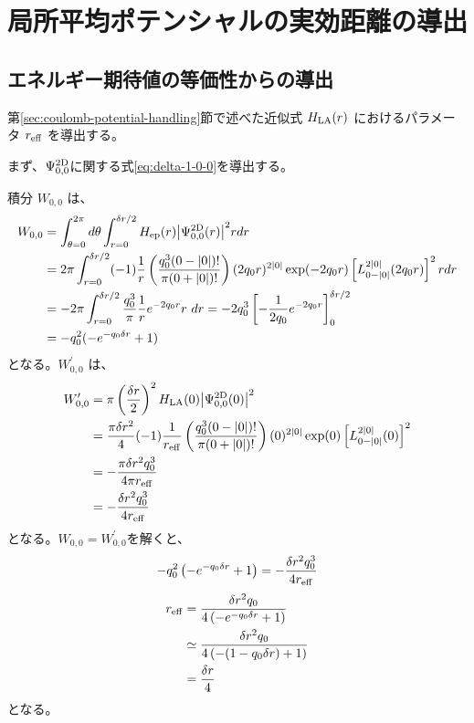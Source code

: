 \documentclass[wabun2025.tex]{subfiles}
\begin{document}
\appendix
\section{局所平均ポテンシャルの実効距離の導出}
\label{chap:appendix_derivation_derivation}
\subsection{エネルギー期待値の等価性からの導出}
第\ref{sec:coulomb-potential-handling}節で述べた近似式 $H_{\mathrm{LA}}(r)$ におけるパラメータ $r_{\mathrm{eff}}$
を導出する。

まず、$\Psi^{\mathrm{2D}}_{0,0}$に関する式\eqref{eq:delta-1-0-0}を導出する。

積分 $W_{0,0}$ は、
\begin{align}
  W_{0,0}
   &= \int_{\theta=0}^{2\pi}d\theta
      \int_{r=0}^{\deltar/2}
      \Hep(r)\abs{\PsiTwoD_{0,0}(r)}^2r dr\notag\\
   &= 2\pi
      \int_{r=0}^{\deltar/2}
      (-1)\frac{1}{r}\left(\frac{q_0^3(0-\abs{0})!}{\pi(0+\abs{0})!}\right)
      (2q_0r)^{2\abs{0}}\exp(-2q_0r)
      \left[L_{0-\abs{0}}^{2\abs{0}}(2q_0r)\right]^2 r dr\notag\\
   &= -2\pi\int_{r=0}^{\deltar/2}\frac{q_0^3}{\pi}\frac{1}{r}e^{-2q_0r}r\ dr=-2q_0^3
      \left[-\frac{1}{2q_0}e^{-2q_0r}\right]_{0}^{\deltar/2}\notag\\
   &=-q_0^2(-e^{-q_0\deltar}+1)
\end{align}
となる。$W_{0,0}^\prime$ は、
\begin{align}
    W_{0,0}^\prime
    &=\pi\left(\frac{\delta r}{2}\right)^2
       H_{\mathrm{LA}}(0){\left| \Psi^{\mathrm{2D}}_{0,0}(0) \right|}^2\notag\\
    &=\frac{\pi\delta r^2}{4}(-1)\frac{1}{r_{\mathrm{eff}}}
    \left(\frac{q_0^3(0-{\left| 0 \right|})!}{\pi(0+{\left| 0 \right|})!}\right)
    (0)^{2{\left| 0 \right|}}\exp(0)\left[L_{0-{\left| 0 \right|}}^{2{\left| 0 \right|}}(0)\right]^2\notag\\
    &= -\frac{\pi\delta r^2q_0^3}{4\pi r_{\mathrm{eff}}}\notag\\
    &= -\frac{\delta r^2q_0^3}{4r_{\mathrm{eff}}}
\end{align}
となる。$W_{0,0}=W_{0,0}^\prime$を解くと、
\begin{equation}
-q_0^2\left(-e^{-q_0\delta r}+1\right)=-\frac{\delta r^2q_0^3}{4r_{\mathrm{eff}}}
\end{equation}
\begin{align}
r_{\mathrm{eff}}&=\frac{\delta r^2q_0}{4\left(-e^{-q_0\delta r}+1\right)}\notag\\
&\simeq\frac{\delta r^2q_0}{4\left(-(1-q_0\delta r)+1\right)}\notag\\
&=\frac{\delta r}{4}
\end{align}
となる。
\end{document}
